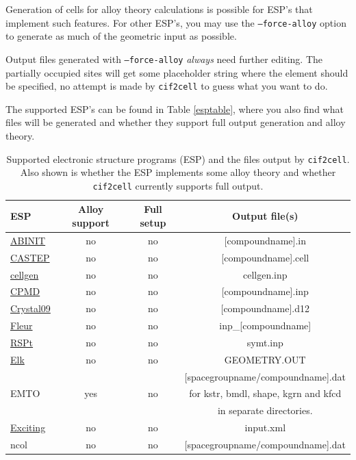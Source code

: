 \documentclass[11pt]{article}
\newcommand{\ciftocell}{\texttt{cif2cell}}
\newenvironment{warning}[1][Warning!]{\begin{trivlist}
\item[\hskip \labelsep {\bfseries #1}]}{\end{trivlist}}
\begin{document}
Generation of cells for alloy theory calculations is possible for ESP's that implement such features. For other ESP's, you may use the \texttt{--force-alloy} option to generate as much of the geometric input as possible. 
\begin{warning}
Output files generated with \texttt{--force-alloy} \emph{always} need further editing. The partially occupied sites will get some placeholder string where the element should be specified, no attempt is made by \ciftocell{} to guess what you want to do.
\end{warning}
 The supported ESP's can be found in Table \ref{esptable}, where you also find what files will be generated and whether they support full output generation and alloy theory.
 
\begin{table}[p]%
\caption{Supported electronic structure programs (ESP) and the files output by \ciftocell. Also shown is whether the ESP implements some alloy theory and whether \ciftocell{} currently supports full output.}
\begin{center}
\begin{tabular}{l|c|c|c}
ESP  & Alloy support & Full setup & Output file(s)\\ \hline
\href{http://www.abinit.org/}{ABINIT} & no & no & [compoundname].in\\
\href{http://www.castep.org/}{CASTEP} & no & no & [compoundname].cell\\
\href{http://www.fplmto-rspt.org/}{cellgen} & no & no & cellgen.inp\\
\href{http://www.cpmd.org}{CPMD} & no & no & [compoundname].inp\\
\href{http://www.crystal.unito.it/}{Crystal09} & no & no & [compoundname].d12\\
\href{http://www.flapw.de}{Fleur} & no & no & inp\_[compoundname]\\
\href{http://www.fplmto-rspt.org/}{RSPt} & no & no & symt.inp\\
\href{http://elk.sourceforge.net}{Elk} & no & no & GEOMETRY.OUT\\
\multirow{3}{*}{EMTO} & & & [spacegroupname/compoundname].dat \\ 
 & yes & no & for kstr, bmdl, shape, kgrn and kfcd \\
 &  & & in separate directories.\\
\href{http://exciting-code.org}{Exciting} & no & no & input.xml\\
\multirow{2}{*}{ncol} & no & no & [spacegroupname/compoundname].dat \\

\end{tabular}
\end{center}
\end{table}
\end{document}
